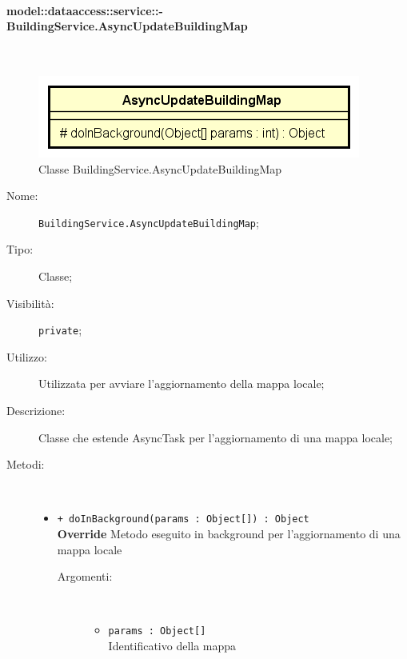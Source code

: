 \documentclass[../DefinizioneDiProdotto.tex]{subfiles}
\begin{document}
\paragraph{model::dataaccess::service::-\\BuildingService.AsyncUpdateBuildingMap}
\
\begin{figure}[H]
	\centering
	\includegraphics[width=\maxwidth]{img/BuildingService-AsyncUpdateBuildingMap.png}
	\caption{Classe BuildingService.AsyncUpdateBuildingMap}\label{fig:model::dataaccess::service::BuildingService.AsyncUpdateBuildingMap} 
\end{figure}
\begin{description}
	\item[Nome:] \texttt{BuildingService.AsyncUpdateBuildingMap};
	\item[Tipo:] Classe;
	\item[Visibilità:] \texttt{private};
	\item[Utilizzo:] Utilizzata per avviare l'aggiornamento della mappa locale;
	\item[Descrizione:] Classe che estende AsyncTask per l'aggiornamento di una mappa locale;
	\item[Metodi:] \
	\begin{itemize}
		\item \texttt{+ doInBackground(params : Object[]) : Object}\\
		\textbf{Override} Metodo eseguito in background per l'aggiornamento di una mappa locale
		\begin{description}
			\item[Argomenti:] \
			\begin{itemize}
				\item \texttt{params : Object[]}\\
				Identificativo della mappa\end{itemize}
		\end{description}
	\end{itemize}
\end{description}
\end{document}
